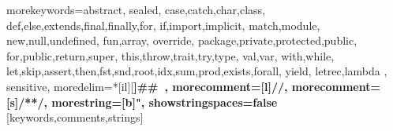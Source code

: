 

%
{morekeywords={abstract,%
  sealed,%
  case,catch,char,class,%
  def,else,extends,final,finally,for,%
  if,import,implicit,%
  match,module,%
  new,null,undefined,%
  fun,array,
  override,%
  package,private,protected,public,%
  for,public,return,super,%
  this,throw,trait,try,type,%
  val,var,%
  with,while,%
  let,skip,assert,then,fst,snd,root,idx,sum,prod,exists,forall,%
  yield,%
  letrec,lambda %
  },%
  sensitive,%
  moredelim=*[il][\bfseries]{\#\#\ },
  morecomment=[l]//,%
  morecomment=[s]{/*}{*/},%
  morestring=[b]",%
  showstringspaces=false%
}[keywords,comments,strings]%



\newcommand{\commentstyle}[1]{\color{ccomment}\itshape{#1}}
\newcommand{\keywordstyle}[1]{\color{ckeyword}{#1}}
\newcommand{\stringstyle}[1]{\color{cstring}\bfseries{#1}}


\newcommand{\code}[1]{\lstinline[language=Scala,columns=fixed,basicstyle=\ttfamily]|#1|}


\newcommand{\IMP}[0]{\texttt{IMP}}
\newcommand{\FUN}[0]{\texttt{FUN}}

\newcommand{\TOOL}[0]{\texttt{SIGMA}}



